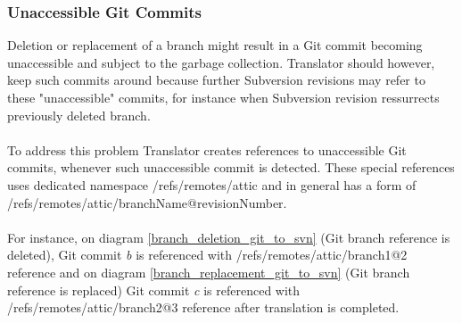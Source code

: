\subsubsection{Unaccessible Git Commits}
Deletion or replacement of a branch might result in a Git commit becoming unaccessible and subject to the 
garbage collection. Translator should however, keep such commits around because further Subversion revisions 
may refer to these "unaccessible" commits, for instance when Subversion revision ressurrects previously
deleted branch.
\\\\
To address this problem Translator creates references to unaccessible Git commits, 
whenever such unaccessible commit is detected. 
These special references uses dedicated namespace /refs/remotes/attic and in general has a form of /refs/remotes/attic/branchName@revisionNumber.
\\\\
For instance, on diagram \ref{branch_deletion_git_to_svn} (Git branch reference is deleted), Git commit \emph{b} is referenced with /refs/remotes/attic/branch1@2 reference and on
diagram \ref{branch_replacement_git_to_svn} (Git branch reference is replaced) Git commit \emph{c} is referenced with /refs/remotes/attic/branch2@3 reference
after translation is completed.